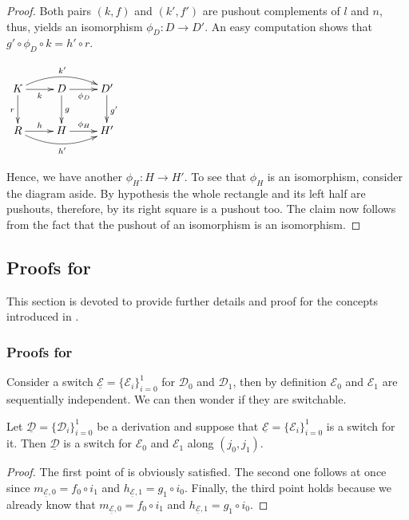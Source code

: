 \documentclass[a4paper,UKenglish,cleveref,pdftex,thm-restate,numberwithinsect,anonymous]{lipics}
\newcommand{\dder}[1]{\mathscr{#1}}
\newcommand{\der}[1]{\underline{\dder{#1}}}
\begin{document}
\propUnique*
\label{propUnique-proof}
\begin{proof}
  Both pairs $(k, f)$ and $(k', f')$ are pushout complements of $l$
  and $n$, thus,  yields an isomorphism
  $\phi_D\colon D\to D'$. An easy computation shows that $g'\circ \phi_D \circ k=h'\circ r$.
  \noindent
  \parbox{3cm}{
    $\xymatrix{K \ar@/^.4cm/[rr]^{k'}\ar[d]_{r} \ar[r]_{k}&
      \ar[r]_{\phi_D} D \ar[d]^{g}& D' \ar[d]^{g'}\\ R
      \ar@/_.4cm/[rr]_{h'} \ar[r]^{h}& H \ar[r]^{\phi_H}& H'}$}
  \hfill
  \parbox{10cm}{ \hspace{15pt}Hence, we have another
    $\phi_H\colon H\to H'$. To see that $\phi_H$ is an isomorphism,
    consider the diagram aside. By hypothesis the whole rectangle and
    its left half are pushouts, therefore, by  its right
    square is a pushout too. The claim now follows from the fact that
    the pushout of an isomorphism is an isomorphism. \qedhere }
\end{proof}


\subsection{Proofs for }

This section is devoted to provide further details and proof for the concepts introduced in .

\subsubsection{Proofs for }


Consider a switch $\der{E}=\{\dder{E}_i\}_{i=0}^1$ for $\dder{D}_0$
and $\dder{D}_1$, then by definition $\dder{E}_0$ and $\dder{E}_1$ are
sequentially independent. We can then wonder if they are switchable.

\begin{proposition}
  \label{prop:switch}
  Let $\der{D}=\{\dder{D}_i\}_{i=0}^1$ be a derivation and suppose
  that $\der{E}=\{\dder{E}_i\}_{i=0}^1$ is a switch for it. Then
  $\der{D}$ is a switch for $\dder{E}_0$ and $\dder{E}_1$ along
  $(j_0, j_1)$.
\end{proposition}

\begin{proof}
    The first point of  is obviously satisfied. The
    second one follows at once since $m_{\der{E},0}= f_0\circ i_1$ and $h_{\der{E},1}= g_{1}\circ i_0$.    Finally, the third point holds because we already know that $m_{\der{E},0}= f_0\circ i_1$ and $h_{\der{E},1}= g_{1}\circ i_0$.
\end{proof}
\end{document}
